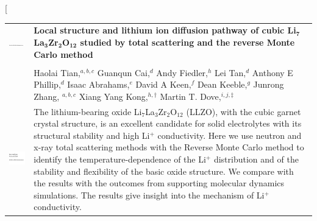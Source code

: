 \documentclass[twoside,twocolumn,9pt]{article}
\begin{document}
\twocolumn[
  \begin{@twocolumnfalse}
\vspace{3cm}
\sffamily
\begin{tabular}{m{4.5cm} p{13.5cm} }

\includegraphics{head_foot/DOI} & \noindent\LARGE{\textbf{Local structure and lithium ion diffusion pathway of cubic Li$_\mathbf{7}$La$_\mathbf{3}$Zr$_\mathbf{2}$O$_\mathbf{12}$ studied by total scattering and the reverse Monte Carlo method}} \\%
\vspace{0.3cm} & \vspace{0.3cm} \\

 & \noindent\large{Haolai Tian,$^{a,b,c}$}
 Guanqun Cai,$^{d}$
 Andy Fiedler,$^{h}$
 Lei Tan,$^{d}$
 Anthony E Phillip,$^{d}$
 Isaac Abrahams,$^{e}$
 David A Keen,$^{f}$
 Dean Keeble,$^{g}$
  Junrong Zhang, $^{a,b,c}$
Xiang Yang Kong,$^{h, \dag}$
Martin T. Dove,\textit{$^{i,j,\ddag}$}
\\%

\includegraphics{head_foot/dates} & \noindent\normalsize{
The lithium-bearing oxide Li$_7$La$_3$Zr$_2$O$_{12}$ (LLZO), with the cubic garnet crystal structure, is an excellent candidate for solid electrolytes with its structural stability and high Li$^+$ conductivity. Here we use neutron and x-ray total scattering methods with the Reverse Monte Carlo method to identify the temperature-dependence of the Li$^+$ distribution and of the stability and flexibility of the basic oxide structure. We compare with the results with the outcomes from supporting molecular dynamics simulations. The results give insight into the mechanism  of Li$^+$ conductivity.
} \\

\end{tabular}

 \end{@twocolumnfalse} \vspace{0.6cm}
\end{document}
